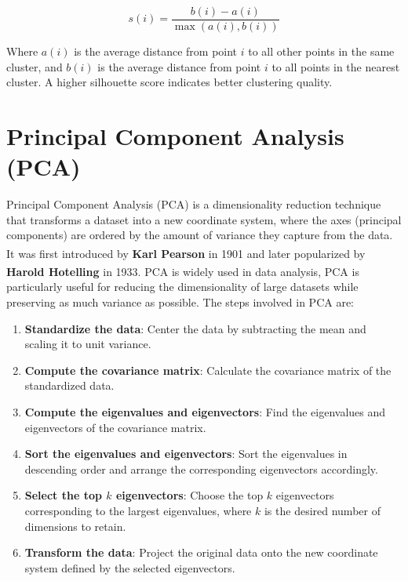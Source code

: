 \begin{equation}
	s(i) = \frac{b(i) - a(i)}{\max(a(i), b(i))}
\end{equation}

Where $a(i)$ is the average distance from point $i$ to all other points in the same cluster, and $b(i)$ is the
average distance from point $i$ to all points in the nearest cluster. A higher silhouette score indicates better
clustering quality.

\section{Principal Component Analysis (PCA)}
\label{subsec:pca}

Principal Component Analysis (PCA) is a dimensionality reduction technique that transforms a dataset into a new coordinate system,
where the axes (principal components) are ordered by the amount of variance they capture from the data. It was first introduced by
\textbf{Karl Pearson} in 1901\textsuperscript{\cite{Pearson-1901}} and later popularized by \textbf{Harold Hotelling} in
1933\textsuperscript{\cite{Hotelling-1933}}. PCA is widely used in data analysis, PCA is particularly useful for reducing the
dimensionality of large datasets while preserving as much variance as possible. The steps involved in PCA are:

\begin{enumerate}
	\item \textbf{Standardize the data}: Center the data by subtracting the mean and scaling it to unit variance.
	\item \textbf{Compute the covariance matrix}: Calculate the covariance matrix of the standardized data.
	\item \textbf{Compute the eigenvalues and eigenvectors}: Find the eigenvalues and eigenvectors of the covariance matrix.
	\item \textbf{Sort the eigenvalues and eigenvectors}: Sort the eigenvalues in descending order and arrange the corresponding
	      eigenvectors accordingly.
	\item \textbf{Select the top $k$ eigenvectors}: Choose the top $k$ eigenvectors corresponding to the largest eigenvalues, where $k$ is
	      the desired number of dimensions to retain.
	\item \textbf{Transform the data}: Project the original data onto the new coordinate system defined by the selected eigenvectors.
\end{enumerate}

